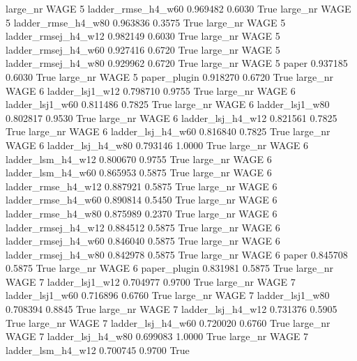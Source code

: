   large_nr     WAGE                 5  ladder_rmse_h4_w60   0.969482      0.6030    True
  large_nr     WAGE                 5  ladder_rmse_h4_w80   0.963836      0.3575    True
  large_nr     WAGE                 5 ladder_rmsej_h4_w12   0.982149      0.6030    True
  large_nr     WAGE                 5 ladder_rmsej_h4_w60   0.927416      0.6720    True
  large_nr     WAGE                 5 ladder_rmsej_h4_w80   0.929962      0.6720    True
  large_nr     WAGE                 5               paper   0.937185      0.6030    True
  large_nr     WAGE                 5        paper_plugin   0.918270      0.6720    True
  large_nr     WAGE                 6     ladder_lsj1_w12   0.798710      0.9755    True
  large_nr     WAGE                 6     ladder_lsj1_w60   0.811486      0.7825    True
  large_nr     WAGE                 6     ladder_lsj1_w80   0.802817      0.9530    True
  large_nr     WAGE                 6   ladder_lsj_h4_w12   0.821561      0.7825    True
  large_nr     WAGE                 6   ladder_lsj_h4_w60   0.816840      0.7825    True
  large_nr     WAGE                 6   ladder_lsj_h4_w80   0.793146      1.0000    True
  large_nr     WAGE                 6   ladder_lsm_h4_w12   0.800670      0.9755    True
  large_nr     WAGE                 6   ladder_lsm_h4_w60   0.865953      0.5875    True
  large_nr     WAGE                 6  ladder_rmse_h4_w12   0.887921      0.5875    True
  large_nr     WAGE                 6  ladder_rmse_h4_w60   0.890814      0.5450    True
  large_nr     WAGE                 6  ladder_rmse_h4_w80   0.875989      0.2370    True
  large_nr     WAGE                 6 ladder_rmsej_h4_w12   0.884512      0.5875    True
  large_nr     WAGE                 6 ladder_rmsej_h4_w60   0.846040      0.5875    True
  large_nr     WAGE                 6 ladder_rmsej_h4_w80   0.842978      0.5875    True
  large_nr     WAGE                 6               paper   0.845708      0.5875    True
  large_nr     WAGE                 6        paper_plugin   0.831981      0.5875    True
  large_nr     WAGE                 7     ladder_lsj1_w12   0.704977      0.9700    True
  large_nr     WAGE                 7     ladder_lsj1_w60   0.716896      0.6760    True
  large_nr     WAGE                 7     ladder_lsj1_w80   0.708394      0.8845    True
  large_nr     WAGE                 7   ladder_lsj_h4_w12   0.731376      0.5905    True
  large_nr     WAGE                 7   ladder_lsj_h4_w60   0.720020      0.6760    True
  large_nr     WAGE                 7   ladder_lsj_h4_w80   0.699083      1.0000    True
  large_nr     WAGE                 7   ladder_lsm_h4_w12   0.700745      0.9700    True
